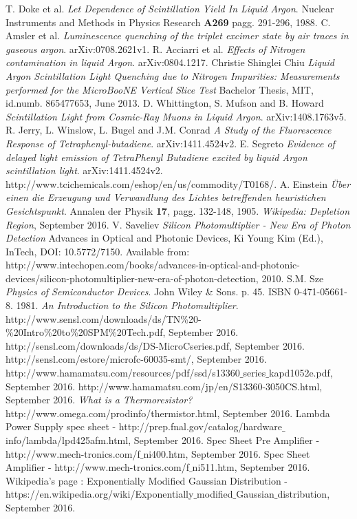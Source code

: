 \documentclass{report}
\begin{document}
  	\begin{thebibliography}{1}

		 T. Doke et al. {\em Let Dependence of Scintillation Yield In Liquid Argon}. Nuclear Instruments and Methods in Physics Research {\textbf {A269}} pagg. 291-296, 1988. 
		 C. Amsler et al. {\em Luminescence quenching of the triplet excimer state by air traces in gaseous argon}. arXiv:0708.2621v1.
		 R. Acciarri et al. {\em Effects of Nitrogen contamination in liquid Argon}. arXiv:0804.1217.
		 Christie Shinglei Chiu {\em Liquid Argon Scintillation Light Quenching due to Nitrogen Impurities: Measurements performed for the MicroBooNE Vertical Slice Test} Bachelor Thesis, MIT, id.numb. 865477653, June 2013.
		 D. Whittington, S. Mufson and B. Howard {\em Scintillation Light from Cosmic-Ray Muons in Liquid Argon}. arXiv:1408.1763v5.
		 R. Jerry, L. Winslow, L. Bugel and J.M. Conrad {\em A Study of the Fluorescence Response of Tetraphenyl-butadiene}. arXiv:1411.4524v2.
		 E. Segreto {\em Evidence of delayed light emission of TetraPhenyl Butadiene excited by liquid Argon scintillation light}. arXiv:1411.4524v2. 
		 http://www.tcichemicals.com/eshop/en/us/commodity/T0168/.
		 A. Einstein {\em \"Uber einen die Erzeugung und Verwandlung des Lichtes betreffenden heuristichen Gesichtspunkt}. Annalen der Physik {\textbf {17}}, pagg. 132-148, 1905.
		 {\em Wikipedia: Depletion Region}, September 2016.
		 V. Saveliev {\em Silicon Photomultiplier - New Era of Photon Detection} Advances in Optical and Photonic Devices, Ki Young Kim (Ed.), InTech, DOI: 10.5772/7150. Available from: http://www.intechopen.com/books/advances-in-optical-and-photonic-devices/silicon-photomultiplier-new-era-of-photon-detection, 2010.
		 S.M. Sze {\em Physics of Semiconductor Devices}. John Wiley \& Sons. p. 45. ISBN 0-471-05661-8. 1981.
		 {\em An Introduction to the Silicon Photomultiplier}. http://www.sensl.com/downloads/ds/TN\%20-\%20Intro\%20to\%20SPM\%20Tech.pdf, September 2016.
  		 http://sensl.com/downloads/ds/DS-MicroCseries.pdf, September 2016.
  		 http://sensl.com/estore/microfc-60035-smt/, September 2016.
		 http://www.hamamatsu.com/resources/pdf/ssd/s13360${\_}$series${\_}$kapd1052e.pdf, September 2016.
		 http://www.hamamatsu.com/jp/en/S13360-3050CS.html, September 2016.
		 {\em What is a Thermoresistor?} http://www.omega.com/prodinfo/thermistor.html, September 2016.
		 Lambda Power Supply spec sheet - http://prep.fnal.gov/catalog/hardware${\_}$info/lambda/lpd425afm.html, September 2016.
		 Spec Sheet Pre Amplifier - http://www.mech-tronics.com/f${\_}$ni400.htm, September 2016.
		 Spec Sheet Amplifier - http://www.mech-tronics.com/f${\_}$ni511.htm, September 2016.
		 Wikipedia's page : Exponentially Modified Gaussian Distribution - https://en.wikipedia.org/wiki/Exponentially${\_}$modified${\_}$Gaussian${\_}$distribution, September 2016.
  	\end{thebibliography}
\end{document}
